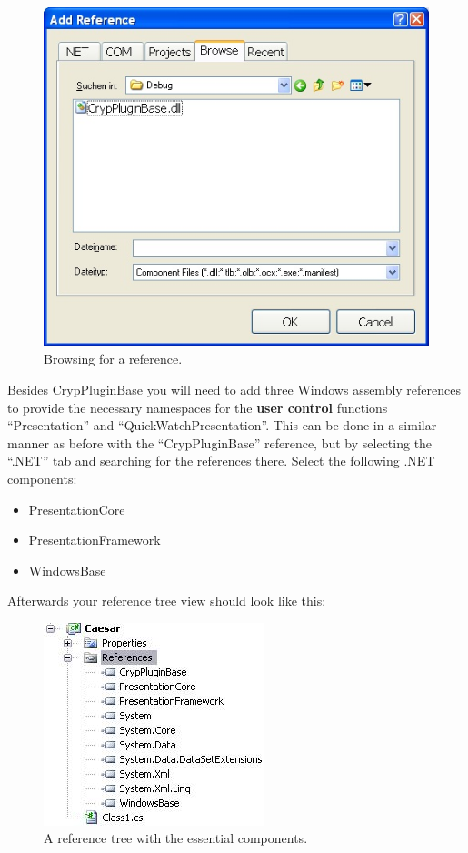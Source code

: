 \begin{figure}[h!]
	\centering
		\includegraphics{figures/browse_reference.jpg}
	\caption{Browsing for a reference.}
	\label{fig:browse_reference}
\end{figure}

\noindent Besides CrypPluginBase you will need to add three Windows assembly references to provide the necessary namespaces for the \textbf{user control} functions ``Presentation'' and ``QuickWatchPresentation''. This can be done in a similar manner as before with the ``CrypPluginBase'' reference, but by selecting the ``.NET'' tab and searching for the references there. Select the following .NET components:

\begin{itemize}
    \item PresentationCore
    \item PresentationFramework
    \item WindowsBase
\end{itemize}
\clearpage

\noindent Afterwards your reference tree view should look like this:

\begin{figure}[h!]
		\includegraphics{figures/reference_tree.jpg}
	\caption{A reference tree with the essential components.}
	\label{fig:reference_tree}
\end{figure}

